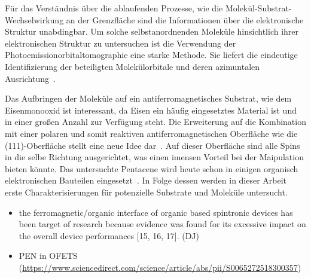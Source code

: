     Für das Verständnis über die ablaufenden Prozesse, wie die Molekül-Substrat-Wechselwirkung an der Grenzfläche sind die Informationen über die elektronische Struktur unabdingbar.
    Um solche selbstanordnenden Moleküle hinsichtlich ihrer elektronischen Struktur zu untersuchen ist die Verwendung der Photoemissionorbitaltomographie eine starke Methode.
    Sie liefert die eindeutige Identifizierung der beteiligten Molekülorbitale und deren azimuntalen Ausrichtung~\cite{MM_2, MM_5}.
    
    Das Aufbringen der Moleküle auf ein antiferromagnetisches Substrat, wie dem Eisenmonooxid ist interessant, da Eisen ein häufig eingesetztes Material ist und in einer großen Anzahl zur Verfügung steht. %
    Die Erweiterung auf die Kombination mit einer polaren und somit reaktiven antiferromagnetischen Oberfläche wie die  (111)-Oberfläche stellt eine neue Idee dar~\cite{cappus_hydroxyl_1993}.
    Auf dieser Oberfläche sind alle Spins in die selbe Richtung ausgerichtet, was einen imensen Vorteil bei der Maipulation bieten könnte.
    Das untersuchte Pentacene wird heute schon in einigen organisch elektronischen Bauteilen eingesetzt~\cite{5A_4}.
    In Folge dessen werden in dieser Arbeit erste Charakterisierungen für potenzielle Substrate und Moleküle untersucht.

\begin{itemize}
    \item the ferromagnetic/organic interface of organic based spintronic devices has been target of research because evidence was found for its excessive impact on the overall device performances [15, 16, 17]. (DJ)
    \item PEN in OFETS (\url{https://www.sciencedirect.com/science/article/abs/pii/S0065272518300357})
\end{itemize}

